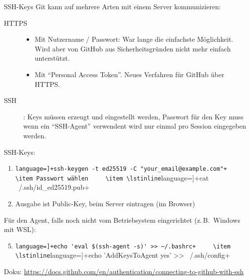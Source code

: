 \begin{frame}[fragile]{SSH-Keys}
  Git kann auf mehrere Arten mit einem Server kommunizieren:
  \begin{description}
    \item[HTTPS]
      \begin{itemize}
        \item Mit Nutzername / Passwort:
          War lange die einfachste Möglichkeit. Wird aber von GitHub aus Sicherheitsgründen nicht mehr einfach unterstützt.
        \item Mit \enquote{Personal Access Token}. Neues Verfahren für GitHub über HTTPS.
      \end{itemize}
    \item[SSH]: Keys müssen erzeugt und eingestellt werden, Passwort für den Key muss wenn ein \enquote{SSH-Agent} verwendent wird nur einmal pro Session eingegeben werden.
  \end{description}

  SSH-Keys:
  \begin{enumerate}
    \item \lstinline[language=]+ssh-keygen -t ed25519 -C "your_email@example.com"+
    \item Passwort wählen
    \item \lstinline[language=]+cat ~/.ssh/id_ed25519.pub+
    \item Ausgabe ist Public-Key, beim Server eintragen (im Browser)
  \end{enumerate}

  Für den Agent, falls noch nicht vom Betriebsystem eingerichtet (z.\,B.\ Windows mit WSL):
  \begin{enumerate}
    \setcounter{enumi}{4}
    \item \lstinline[language=]+echo 'eval $(ssh-agent -s)' >> ~/.bashrc+
    \item \lstinline[language=]+echo 'AddKeysToAgent yes' >> ~/.ssh/config+
  \end{enumerate}

  Doku: \url{https://docs.github.com/en/authentication/connecting-to-github-with-ssh}
\end{frame}

